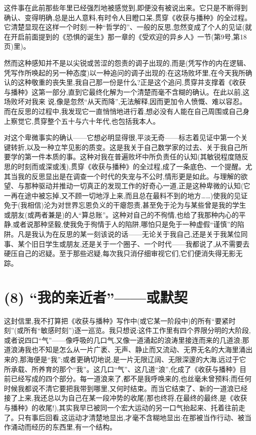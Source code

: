 这件事在此前那些年里已经强烈地被感觉到,即便没有被说出来。它只是不断得到确认、变得明确,总是出人意料,有时令人目瞪口呆,贯穿《收获与播种》的全过程。它清楚显现在这样一个时刻:一种“哲学的”、一般的反思,忽然变成了个人的见证(就在开启前面提到的《恐惧的诞生》那一章的《受欢迎的异乡人》一节(第9号,第18页)里)。

然而这种感知并不是以尖锐或苦涩的怨责的调子出现的,而是(凭写作的内在逻辑、凭写作所唤起的另一种态度)以一种追问的调子出现的:在这场败坏里,在今天我所确认的这种敬重的丧失里,我自己那一份是什么?正是这个追问,贯穿并支撑着《收获与播种》这第一部分,直到它最终化解为一个清楚而毫不含糊的确认。在此以前,这场败坏对我来
说,像是忽然“从天而降”,无法解释,因而更加令人愤慨、难以容忍。而在反思的过程中,我发现它一直悄悄地进行着,想必没有人能在自己周围或自己身上察觉它,贯穿整个五十与六十年代,也包括我本人。

对这个卑微事实的确认——它想必明显得很,平淡无奇——标志着见证中第一个关键转折,以及一种立竿见影的质变。这是我关于自己数学家的过去、关于我自己所要学的第一件本质的事。这种对我在普遍败坏中所负责任的认知(其敏锐程度随反思的时刻而或深或浅),贯穿《收获与播种》的全过程,成了一条底色、一个提醒。尤其当我的反思显出是在调查一个时代的失宠与不公时,情形更是如此。与理解的欲望、与那种驱动并推动一切真正的发现工作的好奇心一道,正是这种卑微的认知(它一再在途中被忘掉,又不顾一切地浮上来,而且总在最料不到的地方……)使我的见证免于(我相信)沦为对世界忘恩负义的干瘪怨责,甚至免于沦为与某些曾是我的学生或朋友(或两者兼是)的人“算总账”。这种对自己的不徇情,也给了我那种内心的平静,或者说那种坚毅,使我免于徇情于人的陷阱,哪怕只是免于一种虚假“谨慎”的陷阱。凡是我认为在反思的某一刻该说的话——无论关于我自己,还是关于我某位同事、某个旧日学生或朋友,还是关于一个圈子、一个时代——我都说了,从不需要去硬压自己的迟疑。至于那些迟疑,每次我只消仔细审视它们,它们便消失得无影无踪。

\section{(8) “我的亲近者”——或默契}

这封信里,我不打算把《收获与播种》写作中(或它某一阶段中)的所有“要紧时刻”(或所有“敏感时刻”)逐一巡览。我只想说:这件工作里有四个界限分明的大阶段,或者说四口“气”——像呼吸的几口气,又像一道涌起的浪涛里接连而来的几道浪;那道浪涛我也不知是怎么从一片广袤、无声、静止而又流动、无界无名的大海里涌出来的,那海便是“我”;或者更确切地说,是一片无限辽阔、无限深邃的大海,远过于它所承载、所养育的那个“我”。这几口“气”、这几道“浪”,化成了《收获与播种》目前已经写成的四个部分。每一道浪来了,都不是我呼唤来的,也丝毫未曾预料;而任何时候我都说不清它要把我带到哪里,又何时结束。而当它结束了、新的一道浪已经接了上来,我还总以为自己在某一段冲势的收尾(那也终将,在最终的最终,是《收获与播种》的收尾!),其实我早已被同一个宏大运动的另一口气抬起来、托着往前走了。只有事后回看,这运动才清楚地显出,才毫不含糊地显出:在那被当作行动、被当作涌动而经历的东西里,有一个结构。

